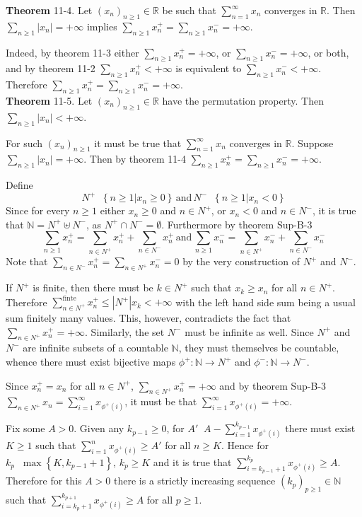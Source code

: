 \documentclass[a4paper]{article}
\newcommand{\obj}[1]{\left\{ #1 \right \}}
\newcommand{\brac}[1]{\left ( #1 \right )}
\newcommand{\induc}[1]{\left . #1 \right \vert}
\newcommand{\abs}[1]{\left | #1 \right |}
\newcommand{\Real}{\mathbb{R}}
\newcommand{\defn}{\mathop{\overset{\Delta}{=}}\nolimits}
\begin{document}
\label{thm:absolute_summation_4} \noindent \textbf{Theorem} 11-4.
Let $\brac{x_n}_{n\geq1}\in \Real$ be such that $\sum_{n=1}^\infty x_n$ converges in $\Real$. Then $\sum_{n\geq 1} \abs{x_n}=+\infty$ implies $\sum_{n\geq 1} x_n^+=\sum_{n\geq 1} x_n^-=+\infty$.

Indeed, by theorem 11-3 either $\sum_{n\geq 1} x_n^+=+\infty$, or $\sum_{n\geq 1} x_n^-=+\infty$, or both, and by theorem 11-2 $\sum_{n\geq 1} x_n^+<+\infty$ is equivalent to $\sum_{n\geq 1} x_n^-<+\infty$. Therefore $\sum_{n\geq 1} x_n^+=\sum_{n\geq 1} x_n^-=+\infty$.\\

\label{thm:absolute_summation_5} \noindent \textbf{Theorem} 11-5.
Let $\brac{x_n}_{n\geq1}\in \Real$ have the permutation property. Then $\sum_{n\geq 1} \abs{x_n}<+\infty$.

For such $\brac{x_n}_{n\geq1}$ it must be true that $\sum_{n=1}^\infty x_n$ converges in $\Real$. Suppose $\sum_{n\geq 1} \abs{x_n}=+\infty$. Then by theorem 11-4 $\sum_{n\geq 1} x_n^+=\sum_{n\geq 1} x_n^-=+\infty$.

Define \[N^+\defn \obj{\induc{n\geq 1}x_n\geq 0}\,\text{and}\,N^-\defn \obj{\induc{n\geq 1}x_n<0}\] Since for every $n\geq 1$ either $x_n\geq 0$ and $n\in N^+$, or $x_n<0$ and $n\in N^-$, it is true that $\mathbb{N} = N^+\uplus N^-$, as $N^+\cap N^-=\emptyset$. Furthermore by theorem Sup-B-3 \[\sum_{n\geq 1} x_n^+ = \sum_{n\in N^+} x_n^+ + \sum_{n\in N^-} x_n^+\,\text{and}\,\sum_{n\geq 1} x_n^- = \sum_{n\in N^+} x_n^- + \sum_{n\in N^-} x_n^-\] Note that $\sum_{n\in N^-} x_n^+=\sum_{n\in N^+} x_n^-=0$ by the very construction of $N^+$ and $N^-$.

If $N^+$ is finite, then there must be $k\in N^+$ such that $x_k\geq x_n$ for all $n\in N^+$. Therefore $\sum_{n\in N^+}^\text{finte}x_n^+\leq \abs{N^+} x_k<+\infty$ with the left hand side sum being a usual sum finitely many values. This, however, contradicts the fact that $\sum_{n\in N^+} x_n^+=+\infty$. Similarly, the set $N^-$ must be infinite as well. Since $N^+$ and $N^-$ are infinite subsets of a countable $\mathbb{N}$, they must themselves be countable, whence there must exist bijective maps $\phi^+:\mathbb{N}\to N^+$ and $\phi^-:\mathbb{N}\to N^-$.

Since $x_n^+=x_n$ for all $n\in N^+$, $\sum_{n\in N^+} x_n^+=+\infty$ and by theorem Sup-B-3 $\sum_{n\in N^+} x_n = \sum_{i=1}^\infty x_{\phi^+\brac{i}}$, it must be that $\sum_{i=1}^\infty x_{\phi^+\brac{i}}=+\infty$.

Fix some $A>0$. Given any $k_{p-1}\geq 0$, for $A'\defn A-\sum_{i=1}^{k_{p-1}} x_{\phi^+\brac{i}}$ there must exist $K\geq 1$ such that $\sum_{i=1}^n x_{\phi^+\brac{i}}\geq A'$ for all $n\geq K$. Hence for $k_p\defn \max\obj{K,k_{p-1}+1}$, $k_p\geq K$ and it is true that $\sum_{i=k_{p-1}+1}^{k_p} x_{\phi^+\brac{i}}\geq A$. Therefore for this $A>0$ there is a strictly increasing sequence $\brac{k_p}_{p\geq 1} \in \mathbb{N}$ such that $\sum_{i=k_p+1}^{k_{p+1}} x_{\phi^+\brac{i}}\geq A$ for all $p\geq 1$.
\end{document}
